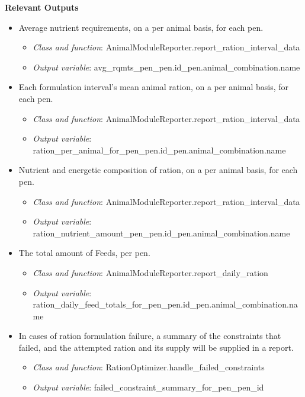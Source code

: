 \documentclass{article}
\begin{document}
\begin{refsection}
\textbf{Relevant Outputs}
\begin{itemize}
    \item Average nutrient requirements, on a per animal basis, for each pen.
    \begin{itemize}
        \item \textit{Class and function}: AnimalModuleReporter.report\_ration\_interval\_data
        \item \textit{Output variable}: avg\_rqmts\_pen\_{pen.id}\_{pen.animal\_combination.name}
    \end{itemize}
    \item Each formulation interval’s mean animal ration, on a per animal basis, for each pen.
    \begin{itemize}
        \item \textit{Class and function}: AnimalModuleReporter.report\_ration\_interval\_data
        \item \textit{Output variable}: ration\_per\_animal\_for\_pen\_{pen.id}\_{pen.animal\_combination.name}
    \end{itemize}
    \item Nutrient and energetic composition of ration, on a per animal basis, for each pen.
    \begin{itemize}
        \item \textit{Class and function}: AnimalModuleReporter.report\_ration\_interval\_data
        \item \textit{Output variable}: ration\_nutrient\_amount\_pen\_{pen.id}\_{pen.animal\_combination.name}
    \end{itemize}
    \item The total amount of Feeds, per pen.
    \begin{itemize}
        \item \textit{Class and function}: AnimalModuleReporter.report\_daily\_ration
        \item \textit{Output variable}: ration\_daily\_feed\_totals\_for\_pen\_{pen.id}\_{pen.animal\_combination.name}
    \end{itemize}
    \item In cases of ration formulation failure, a summary of the constraints that failed, and the attempted ration and its supply will be supplied in a report.
    \begin{itemize}
        \item \textit{Class and function}: RationOptimizer.handle\_failed\_constraints
        \item \textit{Output variable}: failed\_constraint\_summary\_for\_pen\_{pen\_id}
    \end{itemize}	
\end{itemize}


\end{refsection}
\end{document}
